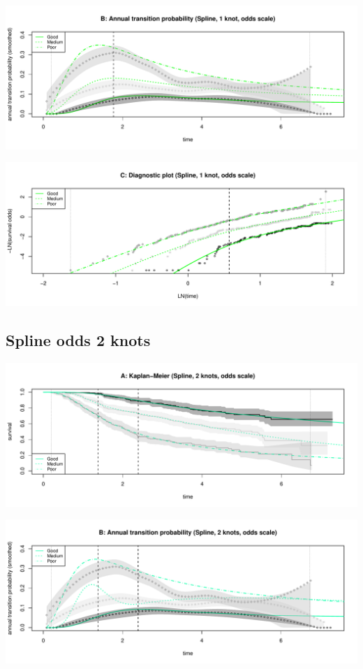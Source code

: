 \documentclass[]{article}
\begin{document}
\begin{flushleft}\includegraphics[height=0.3\textheight]{Images/spline_odds1-2} \end{flushleft}

\begin{flushleft}\includegraphics[height=0.3\textheight]{Images/spline_odds1-3} \end{flushleft}

\subsection{Spline odds 2 knots}\label{spline-odds-2-knots}

\begin{flushleft}\includegraphics[height=0.3\textheight]{Images/spline_odds2-1} \end{flushleft}

\begin{flushleft}\includegraphics[height=0.3\textheight]{Images/spline_odds2-2} \end{flushleft}
\end{document}
